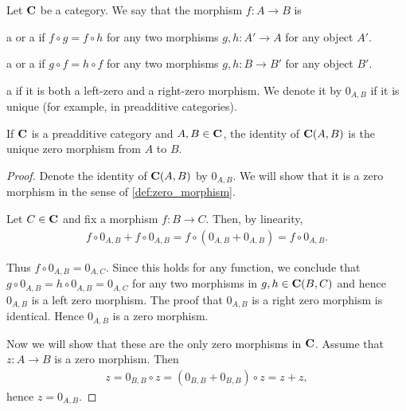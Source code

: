 \begin{definition}\label{def:zero_morphism}
  Let \( \operatorname{\mathbf{C}} \) be a category. We say that the morphism \( f: A \to B \) is
  \begin{defenum}
    \item\label{def:zero_morphism/left} a  or a  if \( f \circ g = f \circ h \) for any two morphisms \( g, h: A' \to A \) for any object \( A' \).
    \item\label{def:zero_morphism/right} a  or a  if \( g \circ f = h \circ f \) for any two morphisms \( g, h: B \to B' \) for any object \( B' \).
    \item\label{def:zero_morphism/bidirectional} a  if it is both a left-zero and a right-zero morphism. We denote it by \( 0_{A,B} \) if it is unique (for example, in preadditive categories).
  \end{defenum}
\end{definition}

\begin{proposition}\label{def:preadditive_zero_morphisms}
  If \( \operatorname{\mathbf{C}} \) is a preadditive category and \( A, B \in \operatorname{\mathbf{C}} \), the identity of \( \operatorname{\mathbf{C}}(A, B) \) is the unique zero morphism from \( A \) to \( B \).
\end{proposition}
\begin{proof}
  Denote the identity of \( \operatorname{\mathbf{C}}(A, B) \) by \( 0_{A,B} \). We will show that it is a zero morphism in the sense of \cref{def:zero_morphism}.

  Let \( C \in \operatorname{\mathbf{C}} \) and fix a morphism \( f: B \to C \). Then, by linearity,
  \begin{align*}
    f \circ 0_{A,B} + f \circ 0_{A,B}
    =
    f \circ (0_{A,B} + 0_{A,B})
    =
    f \circ 0_{A,B}.
  \end{align*}

  Thus \( f \circ 0_{A,B} = 0_{A,C} \). Since this holds for any function, we conclude that \( g \circ 0_{A,B} = h \circ 0_{A,B} = 0_{A,C} \) for any two morphisms in \( g, h \in \operatorname{\mathbf{C}}(B,C) \) and hence \( 0_{A,B} \) is a left zero morphism. The proof that \( 0_{A,B} \) is a right zero morphism is identical. Hence \( 0_{A,B} \) is a zero morphism.

  Now we will show that these are the only zero morphisms in \( \operatorname{\mathbf{C}} \). Assume that \( z: A \to B \) is a zero morphism. Then
  \begin{align*}
    z = 0_{B,B} \circ z = (0_{B,B} + 0_{B,B}) \circ z = z + z,
  \end{align*}
  hence \( z = 0_{A,B} \).
\end{proof}

